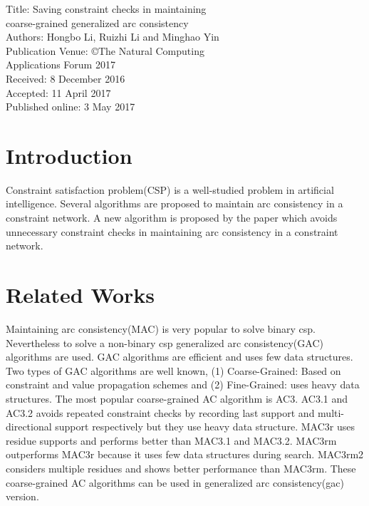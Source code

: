 \documentclass[11pt , conference]{IEEEtran}
\begin{document}
\noindent Title: Saving constraint checks in maintaining\\ coarse-grained
generalized arc consistency\\
Authors: Hongbo Li, Ruizhi Li and Minghao Yin\\
Publication Venue: \copyright  The Natural Computing\\
Applications Forum 2017\\
Received: 8 December 2016\\ Accepted: 11 April 2017\\ Published online: 3 May 2017

\section{Introduction}
Constraint satisfaction problem(CSP) is a well-studied problem in artificial intelligence. Several algorithms are proposed to maintain arc consistency in a constraint network. A new algorithm is proposed by the paper which avoids unnecessary constraint checks in maintaining arc consistency in a constraint network.
\section{Related Works}
\noindent Maintaining arc consistency(MAC) is very popular to solve binary csp. Nevertheless to solve a non-binary csp generalized arc consistency(GAC) algorithms are used. GAC algorithms are efficient and uses few data structures. Two types of GAC algorithms are well known, (1) Coarse-Grained: Based on constraint and value propagation schemes and (2) Fine-Grained: uses heavy data structures. The most popular coarse-grained AC algorithm is AC3. AC3.1 and AC3.2 avoids repeated constraint checks by recording last support and multi-directional support respectively but they use heavy data structure. MAC3r uses residue supports and performs better than MAC3.1 and MAC3.2. MAC3rm outperforms MAC3r because it uses few data structures during search. MAC3rm2 considers multiple residues and shows better performance than MAC3rm. These coarse-grained AC algorithms can be used in generalized arc consistency(gac) version.
\end{document}
